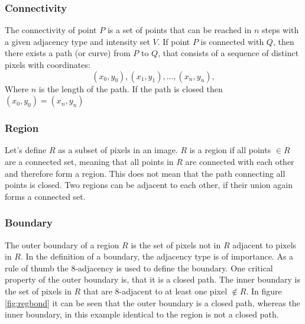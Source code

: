 \subsubsection{Connectivity}
The connectivity of point $P$ is a set of points that can be reached in $n$ steps with a given adjacency type and intensity set $V$. If point $P$ is connected with $Q$, then there exists a path (or curve) from $P$ to $Q$, that consists of a sequence of distinct pixels with coordinates:
\begin{equation*}
    (x_0,y_0),(x_1,y_1),...,(x_n,y_n), 
\end{equation*}
Where $n$ is the length of the path. If the path is closed then $(x_0,y_0) = (x_n,y_n)$
\subsubsection{Region}
Let's define $R$ as a subset of pixels in an image. $R$ is a region if all points $\in R$ are a connected set, meaning that all points in $R$ are connected with each other and therefore form a region. This does not mean that the path connecting all points is closed. Two regions can be adjacent to each other, if their union again forms a connected set. 

\subsubsection{Boundary}
The outer boundary of a region $R$ is the set of pixels not in $R$ adjacent to pixels in $R$. In the definition of a boundary, the adjacency type is of importance. As a rule of thumb the 8-adjacency is used to define the boundary. One critical property of the outer boundary is, that it is a closed path. The inner boundary is the set of pixels in $R$ that are 8-adjacent to at least one pixel $\notin  R$. In figure \ref{fig:regbond} it can be seen that the outer boundary is a closed path, whereas the inner boundary, in this example identical to the region is not a closed path.

